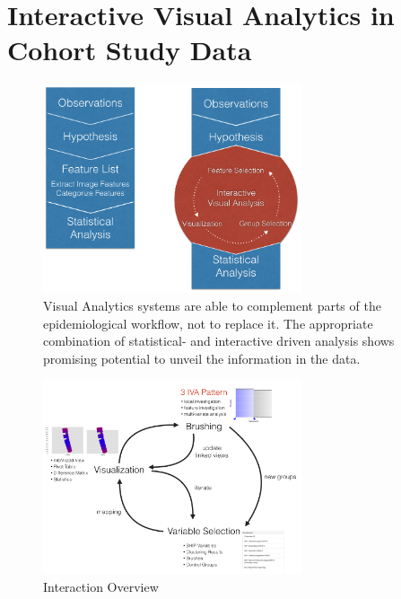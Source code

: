 \documentclass[journal]{style/vgtc}           %
\begin{document}
\section{Interactive Visual Analytics in Cohort Study Data}
\begin{figure}[htb]
 \centering
 \label{fig:WorkflowComparison}
 \includegraphics[width=3.0in]{figures/workflow_comparison}
 \caption{Visual Analytics systems are able to complement parts of the epidemiological workflow, not to replace it. The appropriate combination of statistical- and interactive driven analysis shows promising potential to unveil the information in the data.}
\end{figure}
\begin{figure}[htb]
 \centering
 \includegraphics[width=3.0in]{figures/InteractionLoop}
 \caption{Interaction Overview}
\end{figure}
\end{document}
